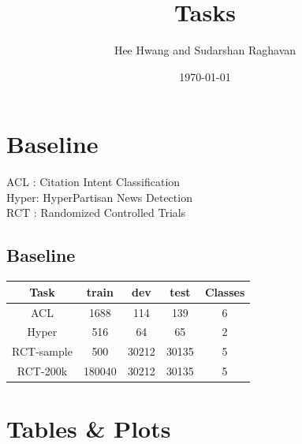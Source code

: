 \documentclass[11pt]{article}
\author{Hee Hwang and Sudarshan Raghavan}
\date{\today}
\title{Tasks}
\begin{document}
\maketitle






\section{Baseline}
\label{sec:orgde99230}
ACL  : Citation Intent Classification\\
Hyper: HyperPartisan News Detection\\
RCT  : Randomized Controlled Trials

\subsection{Baseline}
\label{sec:orgf398a8a}
\begin{center}
\begin{tabular}{|c|c|c|c|c|}
\hline
Task & train & dev & test & Classes\\
\hline
ACL & 1688 & 114 & 139 & 6\\
\hline
Hyper & 516 & 64 & 65 & 2\\
\hline
RCT-sample & 500 & 30212 & 30135 & 5\\
\hline
RCT-200k & 180040 & 30212 & 30135 & 5\\
\hline
\end{tabular}
\end{center}




\section{Tables \& Plots}
\label{sec:org6aa846a}
\end{document}
